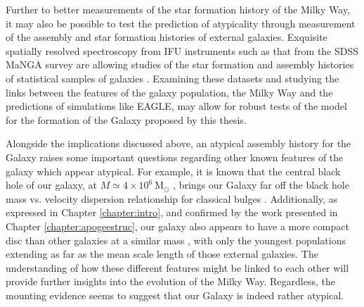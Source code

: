 Further to better measurements of the star formation history of the Milky Way, it may also be possible to test the prediction of atypicality through measurement of the assembly and star formation histories of external galaxies. Exquisite spatially resolved spectroscopy from IFU instruments such as that from the SDSS MaNGA survey \citep[Mapping Nearby Galaxies at Apache Point Observatory;][]{2015ApJ...798....7B} are allowing studies of the star formation and assembly histories of statistical samples of galaxies \citep[e.g.][]{2016MNRAS.463.2799I,2018MNRAS.480.2544R}. Examining these datasets and studying the links between the features of the galaxy population, the Milky Way and the predictions of simulations like EAGLE, may allow for robust tests of the model for the formation of the Galaxy proposed by this thesis.

Alongside the implications discussed above, an atypical assembly history for the Galaxy raises some important questions regarding other known features of the galaxy which appear atypical. For example, it is known that the central black hole of our galaxy, at $M \simeq 4\times 10^{6}\ \mathrm{M_{\odot}}$ \citep[e.g.][]{2009ApJ...707L.114G}, brings our Galaxy far off the black hole mass vs. velocity dispersion relationship for classical bulges \citep[e.g.][]{2013ARA&A..51..511K}. Additionally, as expressed in Chapter \ref{chapter:intro}, and confirmed by the work presented in Chapter \ref{chapter:apogeestruc}, our galaxy also appears to have a more compact disc than other galaxies at a similar mass \citep[e.g. those shown in][]{2010MNRAS.406.1595F}, with only the youngest populations extending as far as the mean scale length of those external galaxies. The understanding of how these different features might be linked to each other will provide further insights into the evolution of the Milky Way. Regardless, the mounting evidence seems to suggest that our Galaxy is indeed rather atypical.



